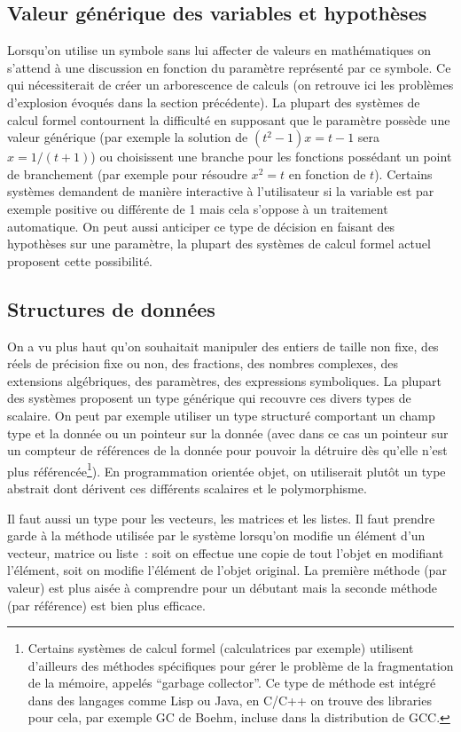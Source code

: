 \documentclass[a4paper,11pt]{article}
\begin{document}
\begin{giacjshere}
\subsection{Valeur générique des variables et
  hypothèses} 
Lorsqu'on utilise un symbole sans lui affecter de valeurs en mathématiques 
on s'attend à une discussion en fonction du 
paramètre représenté par ce symbole. Ce qui nécessiterait de créer un 
arborescence de calculs (on retrouve ici les problèmes 
d'explosion évoqués dans la section précédente). 
La plupart des systèmes de calcul formel contournent la difficulté en 
supposant que le paramètre possède une valeur 
générique (par exemple la solution de $(t^2-1)x=t-1$ sera $x=1/(t+1)$) ou 
choisissent une branche pour les fonctions 
possédant un point de branchement (par exemple pour résoudre $x^2=t$ 
en fonction de $t$). Certains systèmes demandent de 
manière interactive à l'utilisateur si la variable est par exemple positive 
ou différente de 1 mais cela s'oppose à un 
traitement automatique. 
On peut aussi anticiper ce type de décision en faisant des hypothèses
sur une paramètre, la plupart des systèmes de calcul formel actuel
proposent cette possibilité.

\subsection{Structures de données}
On a vu plus haut qu'on souhaitait manipuler des entiers de taille non 
fixe, des réels de précision fixe ou non, des
fractions, des nombres complexes, des extensions algébriques, des 
paramètres, des expressions symboliques. La plupart des syst\`emes
proposent un type générique qui recouvre ces divers types de scalaire.
On peut par exemple utiliser un type structuré comportant un champ
type et la donnée ou un pointeur sur la donnée (avec dans ce cas un 
pointeur sur un compteur de références de la donnée
pour pouvoir la détruire dès qu'elle n'est plus référencée\footnote{Certains
systèmes de calcul formel (calculatrices par exemple) utilisent d'ailleurs des
méthodes spécifiques pour gérer le problème de la fragmentation de
la mémoire, appelés ``garbage collector''. Ce type de méthode
est intégré dans des langages comme Lisp ou Java, en C/C++ on trouve
des libraries pour cela, par exemple GC de Boehm, incluse dans la
distribution de GCC.}). 
En programmation orientée objet, on utiliserait plutôt un
type abstrait dont dérivent ces différents scalaires et le polymorphisme.

Il faut aussi un type pour les vecteurs, les matrices et les
listes. Il faut prendre garde \`a la m\'ethode utilis\'ee
par le syst\`eme lorsqu'on modifie un \'el\'ement
d'un vecteur, matrice ou liste~: soit on effectue une copie de tout
l'objet en modifiant l'\'el\'ement, soit on modifie l'\'el\'ement
de l'objet original. La premi\`ere m\'ethode (par valeur) est
plus ais\'ee \`a comprendre pour un d\'ebutant mais
la seconde m\'ethode (par r\'ef\'erence) est bien plus efficace.


\end{giacjshere}
\end{document}
